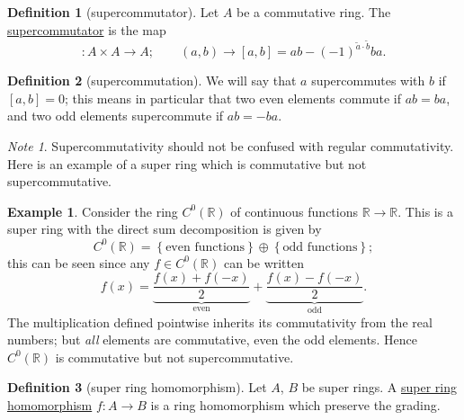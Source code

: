 \documentclass[a4paper,10pt]{scrreprt}
\newcommand{\R}{\mathbb{R}}
\newcommand{\defn}[1]{\ul{#1}}
\theoremstyle{definition}
\newtheorem{definition}{Definition}[section]
\newtheorem{example}{Example}[section]
\theoremstyle{plain}
\theoremstyle{remark}
\newtheorem{note}{Note}[section]
\begin{document}
\begin{definition}[supercommutator]
  \label{def:supercommutator}
  Let $A$ be a commutative ring. The \defn{supercommutator} is the map
  \begin{equation*}
    [\cdot ,\cdot ]\colon A \times A \to A;\qquad (a,b) \to [a,b] = ab - (-1)^{\tilde{a}\cdot \tilde{b}} ba.
  \end{equation*}
\end{definition}

\begin{definition}[supercommutation]
  \label{def:supercommutes}
  We will say that $a$ supercommutes with $b$ if $[a,b] = 0$; this means in particular that two even elements commute if $ab = ba$, and two odd elements supercommute if $ab = -ba$.
\end{definition}
\begin{note}
  Supercommutativity should not be confused with regular commutativity. Here is an example of a super ring which is commutative but not supercommutative.
\end{note}
\begin{example}
  Consider the ring $C^{0}(\R)$ of continuous functions $\R \to \R$. This is a super ring with the direct sum decomposition is given by
  \begin{equation*}
    C^{0}(\R) = \left\{ \text{even functions} \right\} \oplus \left\{ \text{odd functions} \right\};
  \end{equation*}
  this can be seen since any $f \in C^{0}(\R)$ can be written
  \begin{equation*}
    f(x) = \underbrace{\frac{f(x) + f(-x)}{2}}_{\text{even}} + \underbrace{\frac{f(x) - f(-x)}{2}}_{\text{odd}}.
  \end{equation*}
  The multiplication defined pointwise inherits its commutativity from the real numbers; but \emph{all} elements are commutative, even the odd elements. Hence $C^{0}(\R)$ is commutative but not supercommutative.
\end{example}

\begin{definition}[super ring homomorphism]
  \label{def:superringhomomorphism}
  Let $A$, $B$ be super rings. A \defn{super ring homomorphism} $f\colon A \to B$ is a ring homomorphism which preserve the grading.
\end{definition}
\end{document}
